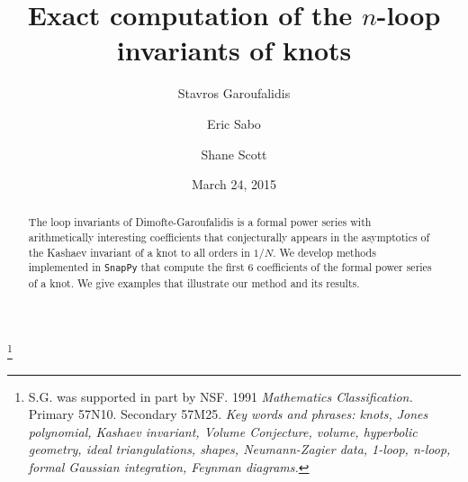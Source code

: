 \documentclass[12pt]{amsart}
\theoremstyle{definition}
\begin{document}

\title[Exact computation of the $n$-loop invariants of knots]{
Exact computation of the $n$-loop invariants of knots}

\author{Stavros Garoufalidis}
\address{School of Mathematics \\
         Georgia Institute of Technology \\
         Atlanta, GA 30332-0160, USA \newline
         {\tt \url{http://www.math.gatech.edu/~stavros }}}
\author{Eric Sabo}
\address{School of Mathematics \\
         Georgia Institute of Technology \\
         Atlanta, GA 30332-0160, USA \newline
         {\tt \url{http://www.math.gatech.edu/users/esabo3 }}}
\author{Shane Scott}
\address{School of Mathematics \\
         Georgia Institute of Technology \\
         Atlanta, GA 30332-0160, USA \newline
         {\tt \url{http://www.math.gatech.edu/users/sscott42 }}}
\thanks{
S.G. was supported in part by NSF.
1991 {\em Mathematics Classification.} Primary 57N10. Secondary 57M25.
\newline
{\em Key words and phrases: knots, Jones polynomial, Kashaev invariant,
Volume Conjecture, volume, hyperbolic geometry, ideal triangulations,
shapes, Neumann-Zagier data, 1-loop, n-loop, formal Gaussian integration,
Feynman diagrams.}
}

\date{March 24, 2015}%


\begin{abstract}
The loop invariants of Dimofte-Garoufalidis is a formal power series with
arithmetically interesting coefficients that conjecturally appears
in the asymptotics of the Kashaev invariant of a knot to all orders in $1/N$.
We develop methods implemented in \texttt{SnapPy} that compute the first 6 
coefficients of the formal power series of a knot. We give examples that
illustrate our method and its results.
\end{abstract}

\maketitle
\end{document}
